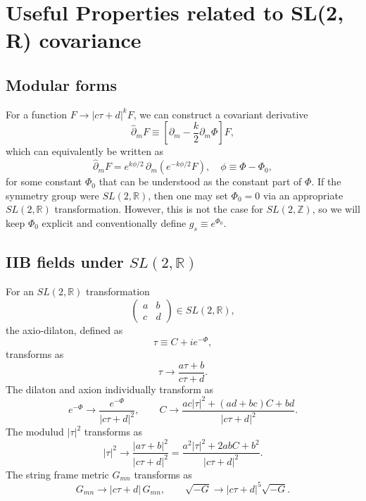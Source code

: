 \section{Useful Properties related to SL(2, R) covariance}
\label{sec:sl2r_covariance}

\subsection{Modular forms}
For a function $F \to |c\tau+d|^k F$, we can construct a covariant derivative
\begin{equation}
\hat{\partial}_m F \equiv \left[\partial_m - \frac{k}{2}\partial_m\Phi \right] F,
\label{U(1)-covariant derivative}
\end{equation}
which can equivalently be written as
\begin{equation}
\hat{\partial}_m F = e^{k\phi/2}\,\partial_m \left(e^{-k\phi/2} F\right),\quad
\phi\equiv \Phi - \Phi_0,
\label{SL2R_completion_by_scaling}
\end{equation}
for some constant $\Phi_0$ that can be understood as the constant part of $\Phi$. If the symmetry group were $SL(2, \mathbb{R})$, then one may set $\Phi_0 = 0$ via an appropriate $SL(2, \mathbb{R})$ transformation. However, this is not the case for $SL(2, \mathbb{Z})$, so we will keep $\Phi_0$ explicit and conventionally define $g_s \equiv e^{\Phi_0}$.

\subsection{IIB fields under \texorpdfstring{$SL(2, \mathbb{R})$}{SL(2, R)}}
For an $SL(2, \mathbb{R})$ transformation
\begin{equation}
\begin{pmatrix}
a & b\\
c & d
\end{pmatrix}
\in SL(2, \mathbb{R}),
\end{equation}
the axio-dilaton, defined as
\begin{equation}
\tau \equiv C + ie^{-\Phi},
\end{equation}
transforms as
\begin{equation}
\tau \to \frac{a\tau + b}{c\tau + d}.
\end{equation}
The dilaton and axion individually transform as
\begin{equation}
e^{-\Phi} \to \frac{e^{-\Phi}}{|c\tau + d|^2},\qquad
C \to \frac{ac|\tau|^2 + (ad+bc)C +bd}{|c\tau+ d|^2}.
\end{equation}
The modulud $|\tau|^2$ transforms as
\begin{equation}
|\tau|^2 \to \frac{|a\tau + b|^2}{|c\tau + d|^2} = \frac{a^2|\tau|^2 + 2abC + b^2}{|c\tau + d|^2}.
\end{equation}
The string frame metric $G_{mn}$ transforms as
\begin{equation}
G_{mn}\to |c\tau + d|\, G_{mn},\qquad
\sqrt{-G} \to |c\tau + d|^5 \sqrt{-G}.
\label{eq:metric-sl2z}
\end{equation}

